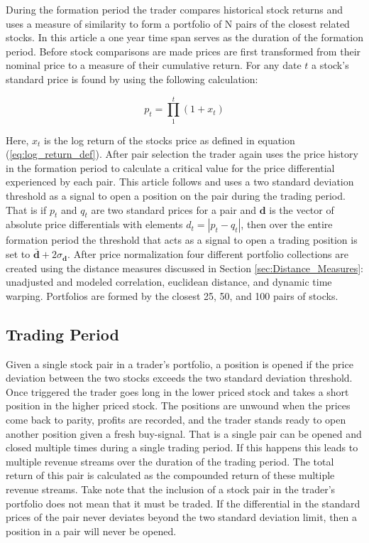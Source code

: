 \documentclass[12pt]{report}
\begin{document}
During the formation period the trader compares historical stock returns and uses a measure of similarity to form a portfolio of N pairs of the closest related stocks. In this article a one year time span serves as the duration of the formation period. Before stock comparisons are made prices are first transformed from their nominal price to a measure of their cumulative return. For any date $t$ a stock's standard price is found by using the following calculation:

\begin{equation} \label{eq:standard_price}
    p_{t} = \prod_{1}^{t} (1 + x_{t})
\end{equation}

Here, $x_{t}$ is the log return of the stocks price as defined in equation (\ref{eq:log_return_def}). After pair selection the trader again uses the price history in the formation period to calculate a critical value for the price differential experienced by each pair. This article follows \cite{Gatev_et_al_2006} and uses a two standard deviation threshold as a signal to open a position on the pair during the trading period. That is if $p_{t}$ and $q_{t}$ are two standard prices for a pair and $\boldsymbol{d}$ is the vector of absolute price differentials with elements $d_{t} = |p_{t} - q_{t}|$, then over the entire formation period the threshold that acts as a signal to open a trading position is set to $\boldsymbol{\bar{d}} + 2 \sigma_{\boldsymbol{d}}$. After price normalization four different portfolio collections are created using the distance measures discussed in Section \ref{sec:Distance_Measures}: unadjusted and modeled correlation, euclidean distance, and dynamic time warping. Portfolios are formed by the closest 25, 50, and 100 pairs of stocks.


\subsection{Trading Period}

Given a single stock pair in a trader's portfolio, a position is opened if the price deviation between the two stocks exceeds the two standard deviation threshold. Once triggered the trader goes long in the lower priced stock and takes a short position in the higher priced stock. The positions are unwound when the prices come back to parity, profits are recorded, and the trader stands ready to open another position given a fresh buy-signal. That is a single pair can be opened and closed multiple times during a single trading period. If this happens this leads to multiple revenue streams over the duration of the trading period. The total return of this pair is calculated as the compounded return of these multiple revenue streams. Take note that the inclusion of a stock pair in the trader's portfolio does not mean that it must be traded. If the differential in the standard prices of the pair never deviates beyond the two standard deviation limit, then a position in a pair will never be opened.
\end{document}
